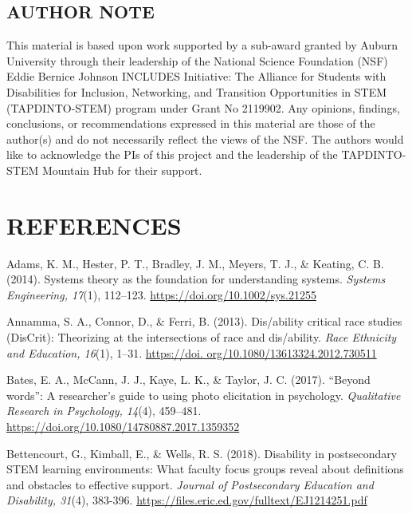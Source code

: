 \documentclass{sig-alternate} %
\begin{document}
\begin{large}
\section*{AUTHOR NOTE}
This material is based upon work supported by a sub-award granted by Auburn University through their leadership of the National Science Foundation (NSF) Eddie Bernice Johnson INCLUDES Initiative: The Alliance for Students with Disabilities for Inclusion, Networking, and Transition Opportunities in STEM (TAPDINTO-STEM) program under Grant No 2119902. Any opinions, findings, conclusions, or recommendations expressed in this material are those of the author(s) and do not necessarily reflect the views of the NSF. The authors would like to acknowledge the PIs of this project and the leadership of the TAPDINTO-STEM Mountain Hub for their support.

\end{large}
\clearpage
\section*{REFERENCES}\par 

\leftskip 0.25in
\parindent -0.25in %

Adams, K. M., Hester, P. T., Bradley, J. M., Meyers, T. J., \& Keating, C. B. (2014). Systems theory as the foundation for understanding systems. \textit{Systems Engineering, 17}(1), 112–123. \url{https://doi.org/10.1002/sys.21255}

Annamma, S. A., Connor, D., \& Ferri, B. (2013). Dis/ability critical race studies (DisCrit): Theorizing at the intersections of race and dis/ability. \textit{Race Ethnicity and Education, 16}(1), 1–31. \url{https://doi. org/10.1080/13613324.2012.730511}

Bates, E. A., McCann, J. J., Kaye, L. K., \& Taylor, J. C. (2017). “Beyond words”: A researcher’s guide to using photo elicitation in psychology. \textit{Qualitative Research in Psychology, 14}(4), 459–481. \url{https://doi.org/10.1080/14780887.2017.1359352}

Bettencourt, G., Kimball, E., \& Wells, R. S. (2018). Disability in postsecondary STEM learning environments: What faculty focus groups reveal about definitions and obstacles to effective support. \textit{Journal of Postsecondary Education and Disability, 31}(4), 383-396. \url{https://files.eric.ed.gov/fulltext/EJ1214251.pdf}
\end{document}
